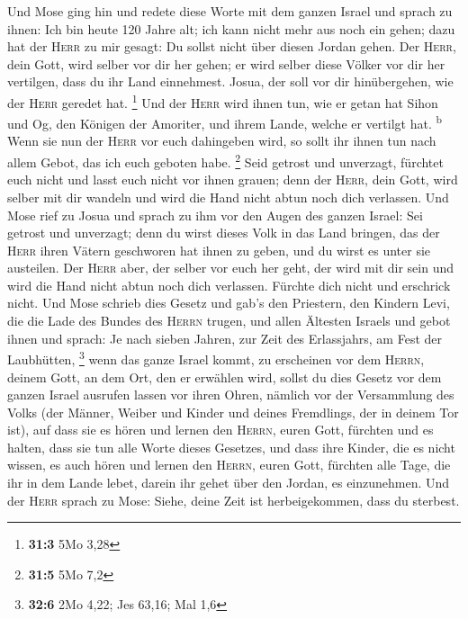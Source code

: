  Und Mose ging hin und redete diese Worte mit dem ganzen
Israel  und sprach zu ihnen: Ich bin heute 120 Jahre alt;
ich kann nicht mehr aus noch ein gehen; dazu hat der \textsc{Herr} zu
mir gesagt: Du sollst nicht über diesen Jordan gehen.  Der
\textsc{Herr}, dein Gott, wird selber vor dir her gehen; er wird selber
diese Völker vor dir her vertilgen, dass du ihr Land einnehmest. Josua,
der soll vor dir hinübergehen, wie der \textsc{Herr} geredet hat.
\footnote{\textbf{31:3} 5Mo 3,28}  Und der \textsc{Herr}
wird ihnen tun, wie er getan hat Sihon und Og, den Königen der Amoriter,
und ihrem Lande, welche er vertilgt hat. \textsuperscript{b}
 Wenn sie nun der \textsc{Herr} vor euch dahingeben wird,
so sollt ihr ihnen tun nach allem Gebot, das ich euch geboten habe.
\footnote{\textbf{31:5} 5Mo 7,2}  Seid getrost und
unverzagt, fürchtet euch nicht und lasst euch nicht vor ihnen grauen;
denn der \textsc{Herr}, dein Gott, wird selber mit dir wandeln und wird
die Hand nicht abtun noch dich verlassen.  Und Mose rief
zu Josua und sprach zu ihm vor den Augen des ganzen Israel: Sei getrost
und unverzagt; denn du wirst dieses Volk in das Land bringen, das der
\textsc{Herr} ihren Vätern geschworen hat ihnen zu geben, und du wirst
es unter sie austeilen.  Der \textsc{Herr} aber, der
selber vor euch her geht, der wird mit dir sein und wird die Hand nicht
abtun noch dich verlassen. Fürchte dich nicht und erschrick nicht.
 Und Mose schrieb dies Gesetz und gab's den Priestern, den
Kindern Levi, die die Lade des Bundes des \textsc{Herrn} trugen, und
allen Ältesten Israels  und gebot ihnen und sprach: Je
nach sieben Jahren, zur Zeit des Erlassjahrs, am Fest der Laubhütten,
\footnote{\textbf{32:6} 2Mo 4,22; Jes 63,16; Mal 1,6} 
wenn das ganze Israel kommt, zu erscheinen vor dem \textsc{Herrn},
deinem Gott, an dem Ort, den er erwählen wird, sollst du dies Gesetz vor
dem ganzen Israel ausrufen lassen vor ihren Ohren, 
nämlich vor der Versammlung des Volks (der Männer, Weiber und Kinder und
deines Fremdlings, der in deinem Tor ist), auf dass sie es hören und
lernen den \textsc{Herrn}, euren Gott, fürchten und es halten, dass sie
tun alle Worte dieses Gesetzes,  und dass ihre Kinder,
die es nicht wissen, es auch hören und lernen den \textsc{Herrn}, euren
Gott, fürchten alle Tage, die ihr in dem Lande lebet, darein ihr gehet
über den Jordan, es einzunehmen.  Und der \textsc{Herr}
sprach zu Mose: Siehe, deine Zeit ist herbeigekommen, dass du sterbest.
